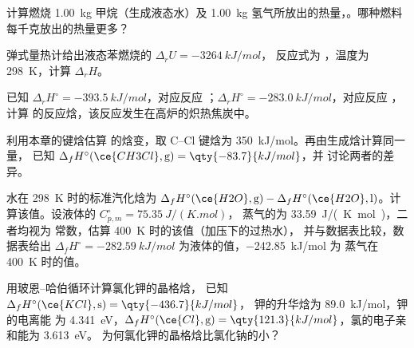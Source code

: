 \begin{exercise}[$\star$]\label{exo:b2:reaction-enthalpy:2}
计算燃烧 \qty{1.00}{kg} 甲烷（生成液态水）及
\qty{1.00}{kg} 氢气所放出的热量，。哪种燃料每千克放出的热量更多？
\end{exercise}

\begin{exercise}[$\star$]\label{exo:b2:reaction-enthalpy:3}
弹式量热计给出液态苯燃烧的 $\Delta_r U = \qty{-3264}{kJ/mol}$，
反应式为 ，温度为
\qty{298}{K}，计算 $\Delta_r H$。
\end{exercise}

\begin{exercise}[$\star$]\label{exo:b2:reaction-enthalpy:4}
已知 $\Delta_r H^\circ = \qty{-393.5}{kJ/mol}$，对应反应 ；$\Delta_r H^\circ = \qty{-283.0}{kJ/mol}$，对应反应 ，计算 
的反应焓，该反应发生在高炉的炽热焦炭中。
\end{exercise}

\begin{exercise}[$\star\star$]\label{exo:b2:reaction-enthalpy:5}
利用本章的键焓估算
的焓变，取
C--Cl 键焓为 \qty{350}{kJ/mol}。再由生成焓计算同一量，
已知 $\Delta_f H^\circ(\ce{CH3Cl}, \text{g}) = \qty{-83.7}{kJ/mol}$，并
讨论两者的差异。
\end{exercise}

\begin{exercise}[$\star\star$]\label{exo:b2:reaction-enthalpy:6}
水在 \qty{298}{K} 时的标准汽化焓为
$\Delta_f H^\circ(\ce{H2O}, \text{g}) - \Delta_f H^\circ(\ce{H2O},
\text{l})$。计算该值。设液体的 $C_{p,m}^\circ = \qty{75.35}{J/(K.mol)}$，
蒸气的为 \qty{33.59}{J/(K.mol)}，二者均视为
常数，估算 \qty{400}{K} 时的该值（加压下的过热水），
并与数据表比较，数据表给出 $\Delta_f H^\circ =
\qty{-282.59}{kJ/mol}$ 为液体的值，\qty{-242.85}{kJ/mol} 为
蒸气在 \qty{400}{K} 时的值。
\end{exercise}

\begin{exercise}[$\star\star$]\label{exo:b2:reaction-enthalpy:7}
用玻恩–哈伯循环计算氯化钾的晶格焓，
已知 $\Delta_f H^\circ(\ce{KCl}, \text{s}) = \qty{-436.7}{kJ/mol}$，
钾的升华焓为 \qty{89.0}{kJ/mol}，钾的电离能
为 \qty{4.341}{eV}，$\Delta_f H^\circ(\ce{Cl}, \text{g}) =
\qty{121.3}{kJ/mol}$，氯的电子亲和能为 \qty{3.613}{eV}。
为何氯化钾的晶格焓比氯化钠的小？
\end{exercise}

